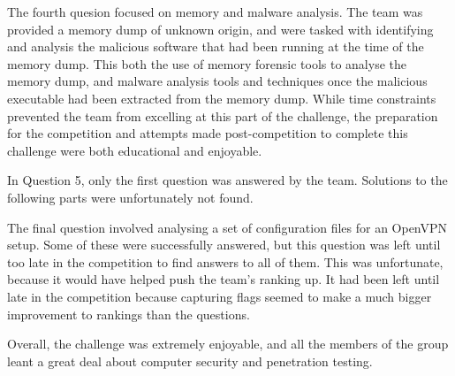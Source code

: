 The fourth quesion focused on memory and malware analysis. The team was provided
a memory dump of unknown origin, and were tasked with identifying and analysis the malicious
software that had been running at the time of the memory dump. This both the use of memory
forensic tools to analyse the memory dump, and malware analysis tools and techniques once
the malicious executable had been extracted from the memory dump. While time constraints prevented
the team from excelling at this part of the challenge, the preparation for the competition
and attempts made post-competition to complete this challenge were both educational and enjoyable. 

In Question 5, only the first question was answered by the team. Solutions to
the following parts were unfortunately not found.

The final question involved analysing a set of configuration files for an 
OpenVPN setup. Some of these were successfully answered, but this question was
left until too late in the competition to find answers to all of them. This
was unfortunate, because it would have helped push the team's ranking up. It
had been left until late in the competition because capturing flags seemed to
make a much bigger improvement to rankings than the questions.

Overall, the challenge was extremely enjoyable, and all the members of the
group leant a great deal about computer security and penetration testing.
